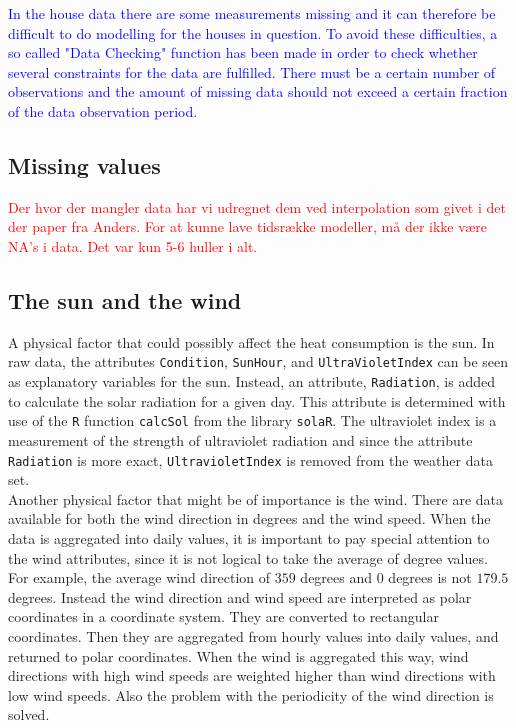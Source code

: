 \textcolor{blue}{In the house data there are some measurements missing and it can therefore be difficult to do modelling for the houses in question. To avoid these difficulties, a so called "Data Checking" function has been made in order to check whether several constraints for the data are fulfilled. There must be a certain number of observations and the amount of missing data should not exceed a certain fraction of the data observation period. }

\subsection{Missing values}
\textcolor{red}{Der hvor der mangler data har vi udregnet dem ved interpolation som givet i det der paper fra Anders. For at kunne lave tidsrække modeller, må der ikke være NA's i data. Det var kun 5-6 huller i alt.}



\subsection{The sun and the wind}
\noindent A physical factor that could possibly affect the heat consumption is the sun. In raw data, the attributes \texttt{Condition}, \texttt{SunHour},  and \texttt{UltraVioletIndex} can be seen as explanatory variables for the sun. Instead, an attribute, \texttt{Radiation}, is added to calculate the solar radiation for a given day. This attribute is determined with use of the \texttt{R} function \texttt{calcSol} from the library \texttt{solaR}. The ultraviolet index is a measurement of the strength of ultraviolet radiation and since the attribute \texttt{Radiation} is more exact, \texttt{UltravioletIndex} is removed from the weather data set. \\

\noindent Another physical factor that might be of importance is the wind. There are data available for both the wind direction in degrees and the wind speed. When the data is aggregated into daily values, it is important to pay special attention to the wind attributes, since it is not logical to take the average of degree values. For example, the average wind direction of $359$ degrees and $0$ degrees is not $179.5$ degrees. Instead the wind direction and wind speed are interpreted as polar coordinates in a coordinate system. They are converted to rectangular coordinates. Then they are aggregated from hourly values into daily values, and returned to polar coordinates.  When the wind is aggregated this way, wind directions with high wind speeds are weighted higher than wind directions with low wind speeds. Also the problem with the periodicity of the wind direction is solved.


